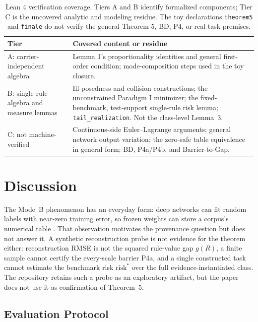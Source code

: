 \documentclass[twoside,11pt]{article}
\begin{document}
\begin{table}[t]
\caption{Lean 4 verification coverage. Tiers A and B identify formalized components; Tier C is the uncovered analytic and modeling residue. The toy declarations \texttt{theorem5} and \texttt{finale} do not verify the general Theorem 5, BD, P4, or real-task premises.}
\label{tab:verification-tiers}
\centering
\small
\begin{tabular}{@{}>{\raggedright\arraybackslash}p{}>{\raggedright\arraybackslash}p{}@{}}
\hline
\textbf{Tier} & \textbf{Covered content or residue}\\
\hline
A: carrier-independent algebra & Lemma 1's proportionality identities and general first-order condition; mode-composition steps used in the toy closure.\\
\hline
B: single-rule algebra and measure lemmas & Ill-posedness and collision constructions; the unconstrained Paradigm I minimizer; the fixed-benchmark, test-support single-rule risk lemma; \texttt{tail\_realization}. Not the class-level Lemma~3.\\
\hline
C: not machine-verified & Continuous-side Euler--Lagrange arguments; general network output variation; the zero-safe table equivalence in general form; BD, P4a/P4b, and Barrier-to-Gap.\\
\hline
\end{tabular}
\end{table}

\section{Discussion}
\label{ch:discussion}%

The Mode~B phenomenon has an everyday form: deep networks can fit random labels with near-zero training error, so frozen weights can store a corpus's numerical table \citep{zhang2021}. That observation motivates the provenance question but does not answer it. A synthetic reconstruction probe is not evidence for the theorem either: reconstruction RMSE is not the squared rule-value gap $g(R)$, a finite sample cannot certify the every-scale barrier P4a, and a single constructed task cannot estimate the benchmark risk $\mathrm{risk}^*$ over the full evidence-instantiated class. The repository retains such a probe as an exploratory artifact, but the paper does not use it as confirmation of Theorem~5.

\subsection{Evaluation Protocol}
\label{sec:protocol}%
\end{document}
